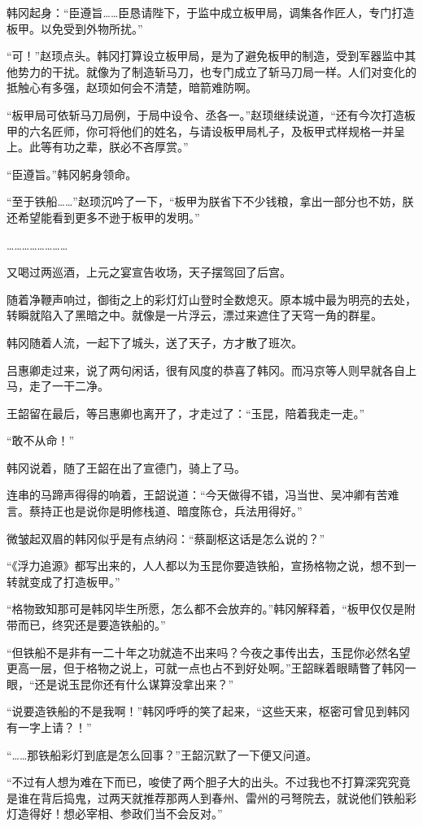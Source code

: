 韩冈起身：“臣遵旨……臣恳请陛下，于监中成立板甲局，调集各作匠人，专门打造板甲。以免受到外物所扰。”

“可！”赵顼点头。韩冈打算设立板甲局，是为了避免板甲的制造，受到军器监中其他势力的干扰。就像为了制造斩马刀，也专门成立了斩马刀局一样。人们对变化的抵触心有多强，赵顼如何会不清楚，暗箭难防啊。

“板甲局可依斩马刀局例，于局中设令、丞各一。”赵顼继续说道，“还有今次打造板甲的六名匠师，你可将他们的姓名，与请设板甲局札子，及板甲式样规格一并呈上。此等有功之辈，朕必不吝厚赏。”

“臣遵旨。”韩冈躬身领命。

“至于铁船……”赵顼沉吟了一下，“板甲为朕省下不少钱粮，拿出一部分也不妨，朕还希望能看到更多不逊于板甲的发明。”

……………………

又喝过两巡酒，上元之宴宣告收场，天子摆驾回了后宫。

随着净鞭声响过，御街之上的彩灯灯山登时全数熄灭。原本城中最为明亮的去处，转瞬就陷入了黑暗之中。就像是一片浮云，漂过来遮住了天穹一角的群星。

韩冈随着人流，一起下了城头，送了天子，方才散了班次。

吕惠卿走过来，说了两句闲话，很有风度的恭喜了韩冈。而冯京等人则早就各自上马，走了一干二净。

王韶留在最后，等吕惠卿也离开了，才走过了：“玉昆，陪着我走一走。”

“敢不从命！”

韩冈说着，随了王韶在出了宣德门，骑上了马。

连串的马蹄声得得的响着，王韶说道：“今天做得不错，冯当世、吴冲卿有苦难言。蔡持正也是说你是明修栈道、暗度陈仓，兵法用得好。”

微皱起双眉的韩冈似乎是有点纳闷：“蔡副枢这话是怎么说的？”

“《浮力追源》都写出来的，人人都以为玉昆你要造铁船，宣扬格物之说，想不到一转就变成了打造板甲。”

“格物致知那可是韩冈毕生所愿，怎么都不会放弃的。”韩冈解释着，“板甲仅仅是附带而已，终究还是要造铁船的。”

“但铁船不是非有一二十年之功就造不出来吗？今夜之事传出去，玉昆你必然名望更高一层，但于格物之说上，可就一点也占不到好处啊。”王韶眯着眼睛瞥了韩冈一眼，“还是说玉昆你还有什么谋算没拿出来？”

“说要造铁船的不是我啊！”韩冈呼呼的笑了起来，“这些天来，枢密可曾见到韩冈有一字上请？！”

“……那铁船彩灯到底是怎么回事？”王韶沉默了一下便又问道。

“不过有人想为难在下而已，唆使了两个胆子大的出头。不过我也不打算深究究竟是谁在背后捣鬼，过两天就推荐那两人到春州、雷州的弓弩院去，就说他们铁船彩灯造得好！想必宰相、参政们当不会反对。”

